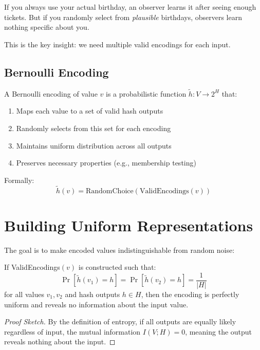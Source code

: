 If you always use your actual birthday, an observer learns it after seeing enough tickets. But if you randomly select from \textit{plausible} birthdays, observers learn nothing specific about you.

This is the key insight: we need multiple valid encodings for each input.

\subsection{Bernoulli Encoding}

\begin{definition}
A Bernoulli encoding of value $v$ is a probabilistic function $\tilde{h}: V \to 2^H$ that:
\begin{enumerate}
\item Maps each value to a set of valid hash outputs
\item Randomly selects from this set for each encoding
\item Maintains uniform distribution across all outputs
\item Preserves necessary properties (e.g., membership testing)
\end{enumerate}
\end{definition}

Formally:
\[
\tilde{h}(v) = \text{RandomChoice}(\text{ValidEncodings}(v))
\]

\section{Building Uniform Representations}

The goal is to make encoded values indistinguishable from random noise:

\begin{theorem}
If ValidEncodings$(v)$ is constructed such that:
\[
\Pr[\tilde{h}(v_1) = h] = \Pr[\tilde{h}(v_2) = h] = \frac{1}{|H|}
\]
for all values $v_1, v_2$ and hash outputs $h \in H$, then the encoding is perfectly uniform and reveals no information about the input value.
\end{theorem}

\begin{proof}[Proof Sketch]
By the definition of entropy, if all outputs are equally likely regardless of input, the mutual information $I(V; H) = 0$, meaning the output reveals nothing about the input.
\end{proof}

